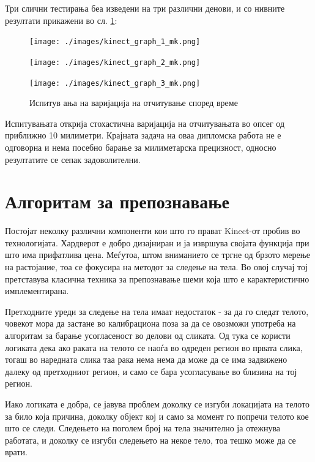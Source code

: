 \documentclass[11pt]{article}
\begin{document}
    Три слични тестирања беа изведени на три различни денови, и со нивните резултати прикажени во сл. \ref{fig:kinectgraphs}:

    \begin{figure}[H]
      \centering
      \begin{minipage}{0.45\linewidth}
        \centering
        \texttt{[image: ./images/kinect\_graph\_1\_mk.png]}
      \end{minipage}
      \begin{minipage}{0.45\linewidth}
          \centering
          \texttt{[image: ./images/kinect\_graph\_2\_mk.png]}
        \end{minipage}
      \texttt{[image: ./images/kinect\_graph\_3\_mk.png]}
      \caption{Испитув ања на варијација на отчитување според време}
      \label{fig:kinectgraphs}
      \end{figure}

    Испитувањата открија стохастична варијација на отчитувањата во опсег од приближно 10 милиметри. Крајната задача на оваа дипломска работа не е одговорна и нема посебно барање за милиметарска прецизност, односно резултатите се сепак задоволителни.

\newpage
\section{Алгоритам за препознавање}

  Постојат неколку различни компоненти кои што го прават Kinect-от пробив во технологијата. Хардверот е добро дизајниран и ја извршува својата функција при што има прифатлива цена. Меѓутоа, штом вниманието се тргне од брзото мерење на растојание, тоа се фокусира на методот за следење на тела. Во овој случај тој претставува класична техника за препознавање шеми која што е карактеристично имплементирана.\bigbreak

	Претходните уреди за следење на тела имаат недостаток - за да го следат телото, човекот мора да застане во калибрациона поза за да се овозможи употреба на алгоритам за барање усогласеност во делови од сликата. Од тука се користи логиката дека ако раката на телото се наоѓа во одреден регион во првата слика, тогаш во наредната слика таа рака нема нема да може да се има задвижено далеку од претходниот регион, и само се бара усогласување во близина на тој регион.\bigbreak

	Иако логиката е добра, се јавува проблем доколку се изгуби локацијата на телото за било која причина, доколку објект кој и само за момент го попречи телото кое што се следи. Следењето на поголем број на тела значително ја отежнува работата, и доколку се изгуби следењето на некое тело, тоа тешко може да се врати.\bigbreak
\end{document}
